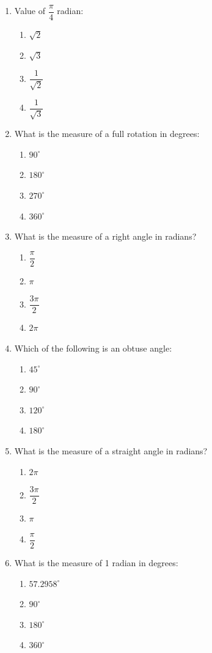 \documentclass[11pt]{article}
\begin{document}
\begin{enumerate}[label=\textbf{\arabic*.}, start=204, leftmargin=2em]
\item Value of $\dfrac{\pi}{4}$ radian:
\begin{enumerate}[label=(\Alph*)] \item $\sqrt{2}$ \item $\sqrt{3}$ \item $\dfrac{1}{\sqrt{2}}$ \item $\dfrac{1}{\sqrt{3}}$ \end{enumerate}

\item What is the measure of a full rotation in degrees:
\begin{enumerate}[label=(\Alph*)] \item $90^\circ$ \item $180^\circ$ \item $270^\circ$ \item $360^\circ$ \end{enumerate}

\item What is the measure of a right angle in radians?
\begin{enumerate}[label=(\Alph*)] \item $\dfrac{\pi}{2}$ \item $\pi$ \item $\dfrac{3\pi}{2}$ \item $2\pi$ \end{enumerate}

\item Which of the following is an obtuse angle:
\begin{enumerate}[label=(\Alph*)] \item $45^\circ$ \item $90^\circ$ \item $120^\circ$ \item $180^\circ$ \end{enumerate}

\item What is the measure of a straight angle in radians?
\begin{enumerate}[label=(\Alph*)] \item $2\pi$ \item $\dfrac{3\pi}{2}$ \item $\pi$ \item $\dfrac{\pi}{2}$ \end{enumerate}

\item What is the measure of 1 radian in degrees:
\begin{enumerate}[label=(\Alph*)] \item $57.2958^\circ$ \item $90^\circ$ \item $180^\circ$ \item $360^\circ$ \end{enumerate}


\end{enumerate}
\end{document}
